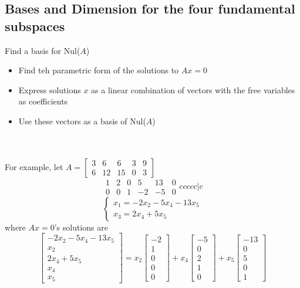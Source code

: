 \begin{enumerate}
\section{Bases and Dimension for the four fundamental subspaces}
Find a basis for Nul($A$)
\begin{itemize}
  \item Find teh parametric form of the solutions to $Ax = 0$ 
  \item Express solutions $x$ as a linear combination of vectors with the free variables 
    as coefficients 
  \item Use these vectors as a basis of Nul($A$)
\end{itemize} \\\\
For example, let $A = \begin{bmatrix} 3 & 6 & 6 & 3 & 9 \\
6 & 12 & 15 & 0 & 3 \end{bmatrix}$ 
\[
  \begin{array}{ccccc|c} 
    1 & 2 & 0 & 5 & 13 & 0 \\
    0 & 0 & 1 & -2 & -5 & 0 
  \end{array}{ccccc|c}
\]
\[
  \begin{cases}
  x_1 = -2x_2 - 5x_4 - 13x_5 \\
  x_3 = 2x_4 + 5x_5
  \end{cases}
\] where $Ax = 0$'s solutions are 
\[
  \begin{bmatrix} -2x_2 - 5x_4 - 13x_5 \\ x_2 \\ 2x_4 + 5x_5 \\ x_4 \\ x_5 
  \end{bmatrix} = 
  x_2 \begin{bmatrix} -2 \\ 1 \\ 0 \\ 0 \\ 0 \end{bmatrix} + 
  x_4 \begin{bmatrix} -5 \\ 0 \\ 2 \\ 1 \\ 0 \end{bmatrix} + 
  x_5 \begin{bmatrix} -13 \\ 0 \\ 5 \\ 0 \\ 1 \end{bmatrix}
\]
\end{enumerate}
